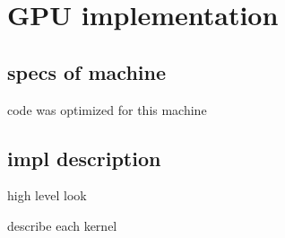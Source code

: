 \chapter{GPU implementation}

\section{specs of machine}

code was optimized for this machine

\section{impl description}

high level look

describe each kernel